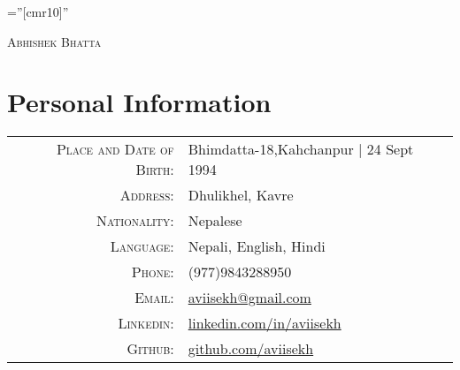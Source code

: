 \documentclass[a4paper,10pt]{article}
\begin{document}

\pagestyle{empty} %

\font\fb=''[cmr10]'' %

\par{\centering
		{\huge \textsc{Abhishek} \textsc{Bhatta}
	}\bigskip\par}


\section{Personal Information}

\begin{tabular}{rl}
    \textsc{Place and Date of Birth:} & Bhimdatta-18,Kahchanpur  | 24 Sept 1994 \\
    \textsc{Address:}   & Dhulikhel, Kavre \\
    \textsc{Nationality:} & Nepalese\\
    \textsc{Language:} & Nepali, English, Hindi\\
    \textsc{Phone:}     & (977)9843288950\\
    \textsc{Email:}     & \href{mailto:aviisekh@gmail.com}{aviisekh@gmail.com}\\
    \textsc{Linkedin:} & \href{https://www.linkedin.com/in/aviisekh}{linkedin.com/in/aviisekh}\\
    \textsc{Github:} & \href{https://www.github.com/aviisekh}{github.com/aviisekh}\\
\end{tabular}

\end{document}
